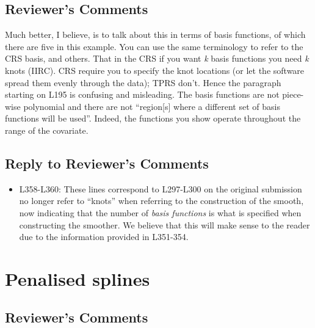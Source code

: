 \documentclass[
]{article}
\providecommand{\tightlist}{%
  \setlength{\itemsep}{0pt}\setlength{\parskip}{0pt}}
\begin{document}
\hypertarget{reviewers-comments-4}{%
\subsection{Reviewer's Comments}\label{reviewers-comments-4}}

Much better, I believe, is to talk about this in terms of basis functions, of which there are five in this example. You can use the same terminology to refer to the CRS basis, and others. That in the CRS if you want \emph{k} basis functions you need \emph{k} knots (IIRC). CRS require you to specify the knot locations (or let the software spread them evenly through the data); TPRS don't.
Hence the paragraph starting on L195 is confusing and misleading. The basis functions are not piece-wise polynomial and there are not ``region{[}s{]} where a different set of basis functions will be used''. Indeed, the functions you show
operate throughout the range of the covariate.

\hypertarget{section-5}{%
\subsection{\texorpdfstring{\textcolor{reviewersblue} {Reply to Reviewer's Comments}}{}}\label{section-5}}

\begin{itemize}
\tightlist
\item
  L358-L360: These lines correspond to L297-L300 on the original submission no longer refer to ``knots'' when referring to the construction of the smooth, now indicating that the number of \emph{basis functions} is what is specified when constructing the smoother. We believe that this will make sense to the reader due to the information provided in L351-354.
\end{itemize}

\hypertarget{penalised-splines}{%
\section{Penalised splines}\label{penalised-splines}}

\hypertarget{reviewers-comments-5}{%
\subsection{Reviewer's Comments}\label{reviewers-comments-5}}
\end{document}
